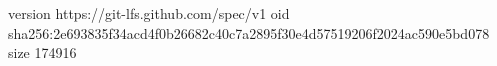 version https://git-lfs.github.com/spec/v1
oid sha256:2e693835f34acd4f0b26682c40c7a2895f30e4d57519206f2024ac590e5bd078
size 174916
